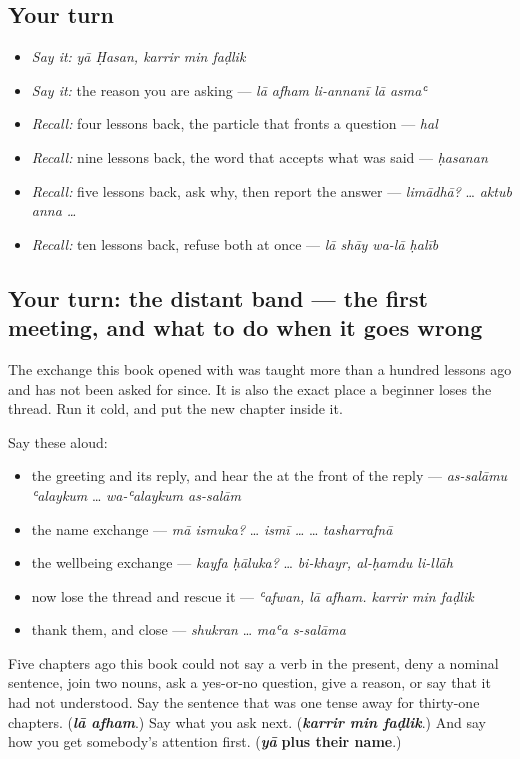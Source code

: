 \subsection*{Your turn}
\begin{itemize}
\raggedright
  \item \emph{Say it:} \emph{yā Ḥasan, karrir min faḍlik}
  \item \emph{Say it:} the reason you are asking — \emph{lā afham li-annanī lā asmaʿ}
  \item \emph{Recall:} four lessons back, the particle that fronts a question — \emph{hal}
  \item \emph{Recall:} nine lessons back, the word that accepts what was said — \emph{ḥasanan}
  \item \emph{Recall:} five lessons back, ask why, then report the answer — \emph{limādhā?} … \emph{aktub anna …}
  \item \emph{Recall:} ten lessons back, refuse both at once — \emph{lā shāy wa-lā ḥalīb}
\end{itemize}

\subsection*{Your turn: the distant band — the first meeting, and what to do when it goes wrong}
The exchange this book opened with was taught more than a hundred lessons ago and has not been asked for since. It is also the exact place a beginner loses the thread. Run it cold, and put the new chapter inside it.

Say these aloud:

\begin{itemize}
\raggedright
  \item the greeting and its reply, and hear the \textbf{} at the front of the reply — \emph{as-salāmu ʿalaykum} … \emph{wa-ʿalaykum as-salām}
  \item the name exchange — \emph{mā ismuka?} … \emph{ismī …} … \emph{tasharrafnā}
  \item the wellbeing exchange — \emph{kayfa ḥāluka?} … \emph{bi-khayr, al-ḥamdu li-llāh}
  \item now lose the thread and rescue it — \emph{ʿafwan, lā afham. karrir min faḍlik}
  \item thank them, and close — \emph{shukran} … \emph{maʿa s-salāma}
\end{itemize}

\begin{tcolorbox}[breakable,colback=teal!4,colframe=teal!35!black,title={Before you move on}]
Five chapters ago this book could not say a verb in the present, deny a nominal sentence, join two nouns, ask a yes-or-no question, give a reason, or say that it had not understood. Say the sentence that was one tense away for thirty-one chapters. (\emph{\textbf{lā afham}}.) Say what you ask next. (\emph{\textbf{karrir min faḍlik}}.) And say how you get somebody's attention first. (\emph{\textbf{yā}} \textbf{plus their name}.)
\end{tcolorbox}
